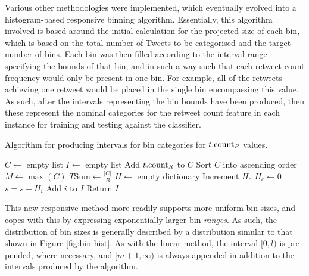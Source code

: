 Various other methodologies were implemented, which eventually evolved into a histogram-based responsive  binning algorithm. Essentially, this algorithm involved is based around the initial calculation for the projected size of each bin, which is based on the total number of Tweets to be categorised and the target number of bins. Each bin was then filled according to the interval range specifying the bounds of that bin, and in such a way such that each retweet count frequency would only be present in one bin. For example, all of the retweets achieving one retweet would be placed in the single bin encompassing this value.\\
As such, after the intervals representing the bin bounds have been produced, then these represent the nominal categories for the retweet count feature in each instance for training and testing against the classifier.



\begin{algorithm}
\caption{Algorithm for producing intervals for bin categories for $t.\textrm{count}_R$ values.}
\begin{algorithmic}[1]
    \State $C\gets$ empty list 
    \State $I\gets$ empty list 
        \State Add $t.\textrm{count}_R$ to $C$
    \EndFor
    \State Sort $C$ into ascending order 
    \State $M\gets\max(C)$ 
    \State $T\textrm{Sum}\gets\frac{|C|}{B}$ 
    \State $H\gets$ empty dictionary 
    \Statex
            \State Increment $H_c$
        \Else
            \State $H_c\gets0$
        \EndIf
    \EndFor
            \State $s = s + H_i$
        \EndIf
            \State Add $i$ to $I$
        \EndIf
    \EndFor
    \State Return $I$
\EndProcedure
\end{algorithmic}
\label{algo2}
\end{algorithm}
 
This new responsive method more readily supports more uniform bin sizes, and copes with this by expressing exponentially larger bin \textit{ranges}. As such, the distribution of bin sizes is generally described by a distribution simular to that shown in Figure \ref{fig:bin-hist}. As with the linear method, the interval $[0,l)$ is pre-pended, where necessary, and $[m+1,\infty)$ is always appended in addition to the intervals produced by the algorithm.

